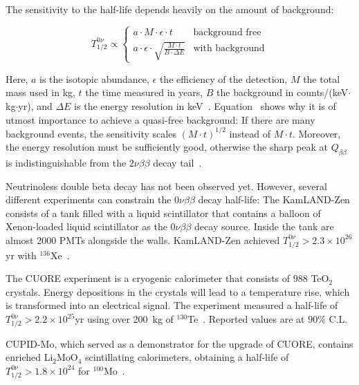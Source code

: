 The sensitivity to the half-life depends heavily on the amount of background: 

\begin{equation}
\label{eq:0vbb_hl_sensitivity}
	T^{0 \nu}_{1/2} \propto 
    \begin{cases}
        a \cdot M \cdot \epsilon \cdot t &  \text{background free} \\
        a \cdot \epsilon \cdot \sqrt{\frac{M \cdot t}{B \cdot \Delta E}} &  \text{with background}
    \end{cases}    
\end{equation}

\noindent Here, $a$ is the isotopic abundance, $\epsilon$ the efficiency of the detection, $M$ the total mass used in kg, $t$ the time measured in years, $B$ the background in counts/(keV$\cdot$kg$\cdot$yr), and $\Delta E$ is the energy resolution in keV~\cite{zuber_neutrino_2020, dolinski_neutrinoless_2019}. 
Equation~ shows why it is of utmost importance to achieve a quasi-free background: If there are many background events, the sensitivity scales $(M \cdot t)^{1/2}$ instead of $M \cdot t$. Moreover, the energy resolution must be sufficiently good, otherwise the sharp peak at $Q_{\beta \beta}$ is indistinguishable from the $2 \nu \beta \beta$ decay tail~\cite{delloro_neutrinoless_2016}. 

Neutrinoless double beta decay has not been observed yet. However, several different experiments can constrain the $0 \nu \beta \beta$ decay half-life: 
The KamLAND-Zen consists of a tank filled with a liquid scintillator that contains a balloon of Xenon-loaded liquid scintillator as the $0 \nu \beta \beta$ decay source. Inside the tank are almost 2000 PMTs alongside the walls. KamLAND-Zen achieved $T^{0 \nu}_{1/2} > 2.3 \times 10^{26}$yr with $^{136}$Xe~\cite{kamland-zen_collaboration_search_2023}. 

The CUORE experiment is a cryogenic calorimeter that consists of 988 TeO$_2$ crystals. Energy depositions in the crystals will lead to a temperature rise, which is transformed into an electrical signal. The experiment measured a half-life of $T^{0 \nu}_{1/2} > 2.2 \times 10^{25}$yr using over 200~kg of $^{130}$Te~\cite{adams_search_2022}. Reported values are at $90 \% $ C.L. 

CUPID-Mo, which served as a demonstrator for the upgrade of CUORE, contains enriched Li$_2$MoO$_4$ scintillating calorimeters, obtaining a half-life of $T^{0 \nu}_{1/2} > 1.8 \times 10^{24}$ for $^{100}$Mo~\cite{augier_final_2022}. 



